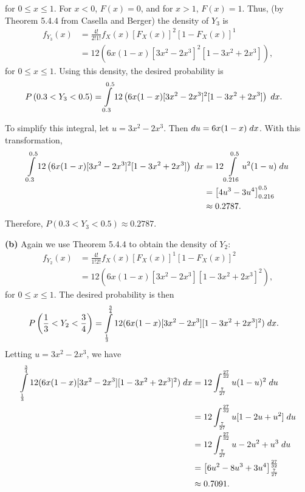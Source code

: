 \documentclass{article}
\begin{document}
\noindent for $0\leq x \leq 1$. For $x<0$, $F(x) = 0$, and for $x>1$, $F(x)=1$.  Thus, (by Theorem 5.4.4 from Casella and Berger) the density of $Y_3$ is
\begin{align}
f_{Y_3}(x) &= \frac{4!}{2!1!}f_X(x)[F_X(x)]^2[1-F_X(x)]^1\\
& = 12\left(6x(1-x)[3x^2 - 2x^3]^2[1-3x^2+2x^3]\right),
\end{align}
\noindent for $0\leq x \leq 1$.  Using this density, the desired probability is
\begin{align}
P\left(0.3 < Y_3 < 0.5\right) &= \int\limits_{0.3}^{0.5}12\left(6x(1-x)[3x^2 - 2x^3]^2[1-3x^2+2x^3]\right) \hspace{1mm} dx.
\end{align}

\noindent To simplify this integral, let $u = 3x^2 -2x^3$.  Then $du = 6x(1-x)\hspace{1mm}dx$.  With this transformation,
\begin{align}
\int\limits_{0.3}^{0.5}12\left(6x(1-x)[3x^2 - 2x^3]^2[1-3x^2+2x^3]\right) \hspace{1mm} dx &= 12\int\limits_{0.216}^{0.5}u^2(1-u) \hspace{1mm} du \\
&= \left[4u^3 - 3u^4\right]^{0.5}_{0.216} \\
&\approx 0.2787.
\end{align}
\noindent Therefore, $P\left(0.3 < Y_3 < 0.5\right) \approx 0.2787$.

\vspace{5mm}

\noindent\textbf{(b)}  Again we use Theorem 5.4.4 to obtain the density of $Y_2$:  
\begin{align}
f_{Y_2}(x) &= \frac{4!}{1!2!}f_X(x)\left[F_X(x)\right]^1\left[1-F_X(x)\right]^2 \\
&= 12(6x(1-x)[3x^2-2x^3][1-3x^2+2x^3]^2),
\end{align}
\noindent for $0\leq x \leq 1$.  The desired probability is then
\begin{align}
P\left(\frac{1}{3} < Y_2 < \frac{3}{4}\right) &= \int\limits_{\frac{1}{3}}^{\frac{3}{4}} 12(6x(1-x)[3x^2-2x^3][1-3x^2+2x^3]^2) \hspace{1mm} dx.
\end{align}
\noindent Letting $u = 3x^2-2x^3$, we have 
\begin{align}
\int\limits_{\frac{1}{3}}^{\frac{3}{4}} 12(6x(1-x)[3x^2-2x^3][1-3x^2+2x^3]^2) \hspace{1mm} dx &= 12\int_{\frac{7}{27}}^{\frac{27}{32}}u(1-u)^2 \hspace{1mm} du \\
&= 12\int_{\frac{7}{27}}^{\frac{27}{32}}u[1 - 2u + u^2] \hspace{1mm} du \\
&= 12\int_{\frac{7}{27}}^{\frac{27}{32}}u - 2u^2 + u^3 \hspace{1mm} du \\
&= \left[6u^2-8u^3+3u^4\right]^{\frac{27}{32}}_{\frac{7}{27}} \\
&\approx 0.7091.
\end{align}
\end{document}
